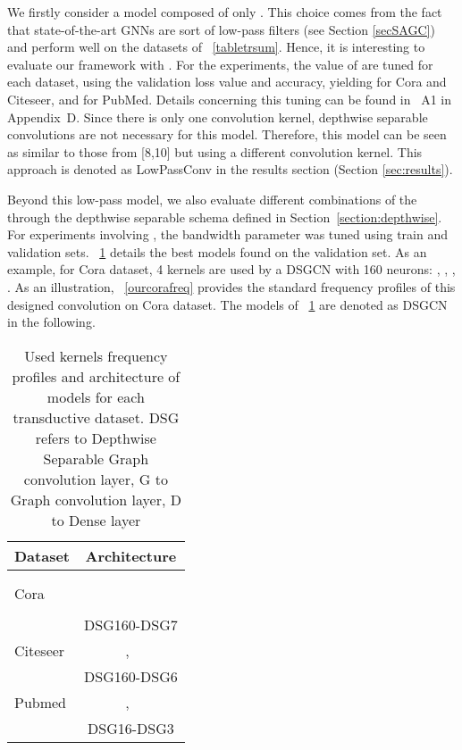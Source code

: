 \documentclass{article}
\begin{document}
We firstly consider a model composed of only . This choice comes from the fact that state-of-the-art GNNs are sort of low-pass filters (see Section \ref{secSAGC}) and perform well on the datasets of \tablename~\ref{tabletrsum}. Hence, it is interesting to evaluate our framework with . For the experiments, the value of  are tuned for each dataset, using the validation loss value and accuracy, yielding  for Cora and Citeseer, and  for PubMed. Details concerning this tuning can be found in \tablename~A1 in Appendix~D. Since there is only one convolution kernel, depthwise separable convolutions are not necessary for this model. Therefore, this model can be seen as similar to those from  [8,10] but using a different convolution kernel. This approach is denoted as {LowPassConv} in the results section (Section \ref{sec:results}).

Beyond this low-pass model, we also evaluate different combinations of the  through the depthwise separable schema defined in Section~\ref{section:depthwise}. For experiments involving  , the bandwidth parameter  was tuned using train and validation sets. \tablename~\ref{tablearch2} details the best models found on the validation set. As an example, for Cora dataset, 4 kernels are used by a DSGCN with 160 neurons: , , , . As an illustration, \figurename~\ref{ourcorafreq} provides the standard frequency profiles of this designed convolution on Cora dataset. The models of \tablename~\ref{tablearch2} are denoted as {DSGCN} in the following. 

\begin{table}\renewcommand{\arraystretch}{1.3}
\caption{Used kernels frequency profiles and architecture of models for each transductive dataset. DSG refers to Depthwise Separable Graph convolution layer, G to Graph convolution layer, D to Dense layer}
\centering

\begin{tabular}{l c  }
\hline
Dataset & Architecture \\
\hline 
&  \\ 
&  \\
Cora & \\ 
&   \\
& DSG160-DSG7 \\
\hline
Citeseer& ,~ \\
 &  DSG160-DSG6 \\
\hline
Pubmed & ,~ \\
 & DSG16-DSG3 \\
 \hline
\end{tabular}
\label{tablearch2}
\end{table}
\end{document}

